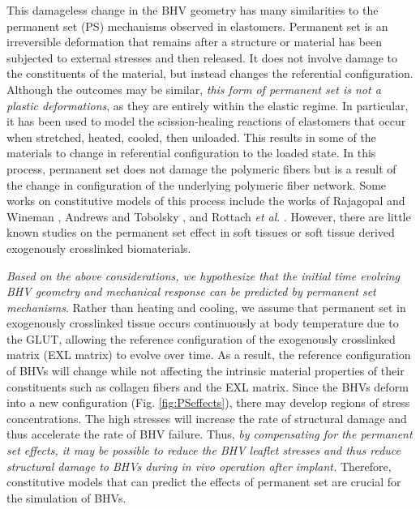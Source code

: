 	
    This damageless change in the BHV geometry has many similarities to the permanent set (PS) mechanisms observed in elastomers. Permanent set is an irreversible deformation that remains after a structure or material has been subjected to external stresses and then released. It does not involve damage to the constituents of the material, but instead changes the referential configuration. Although the outcomes may be similar, \emph{this form of permanent set is not a plastic deformations}, as they are entirely within the elastic regime. In particular, it has been used to model the scission-healing reactions of elastomers that occur when stretched, heated, cooled, then unloaded. This results in some of the materials to change in referential configuration to the loaded state. In this process, permanent set does not damage the polymeric fibers but is a result of the change in configuration of the underlying polymeric fiber network. Some works on constitutive models of this process include the works of Rajagopal and Wineman \cite{rajagopal_constitutive_1992}, Andrews and Tobolsky \cite{andrews_theory_1946}, and Rottach \textit{et al}. \cite{rottach_effect_2004, rottach_molecular_2007, rottach_permanent_2006}. However, there are little known studies on the permanent set effect in soft tissues or soft tissue derived exogenously crosslinked biomaterials. 
	

	\emph{Based on the above considerations, we hypothesize that the initial time evolving BHV geometry and mechanical response can be predicted by permanent set mechanisms}. Rather than heating and cooling, we assume that permanent set in exogenously crosslinked tissue occurs continuously at body temperature due to the GLUT, allowing the reference configuration of the exogenously crosslinked matrix (EXL matrix) to evolve over time. As a result, the reference configuration of BHVs will change while not affecting the intrinsic material properties of their constituents such as collagen fibers and the EXL matrix. Since the BHVs deform into a new configuration (Fig. \ref{fig:PSeffects}), there may develop regions of stress concentrations. The high stresses will increase the rate of structural damage and thus accelerate the rate of BHV failure. Thus, \emph{by compensating for the permanent set effects, it may be possible to reduce the BHV leaflet stresses and thus reduce structural damage to BHVs during \textit{in vivo} operation after implant.} Therefore, constitutive models that can predict the effects of permanent set are crucial for the simulation of BHVs. 

